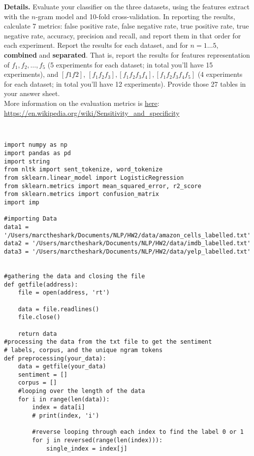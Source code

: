 \documentclass[12pt]{article}
\begin{document}
\begin{enumerate}
{\bf Details.} Evaluate your classifier on the three datasets, using the features extract with the $n$-gram model and 10-fold cross-validation. In reporting the results, calculate 7 metrics: false positive rate, false negative rate, true positive rate, true negative rate, accuracy, precision and recall, and report them in that order for each experiment. Report the results for each dataset, and for $n=1\dots 5$, {\bf combined} and {\bf separated}. That is, report the results for features representation of $f_1, f_2, \dots, f_5$ (5 experiments for each dataset; in total you'll have 15 experiments), and $[f1 f2]$, $[f_1 f_2 f_3], [f_1 f_2 f_3 f_4], [f_1 f_2 f_3 f_4 f_5]$ (4 experiments for each dataset; in total you'll have 12 experiments). Provide those 27 tables in your answer sheet. \\

More information on the evaluation metrics is \href{https://en.wikipedia.org/wiki/Sensitivity_and_specificity}{here}: \url{https://en.wikipedia.org/wiki/Sensitivity_and_specificity}

\lstset{language = Python}
\begin{flushleft}
\begin{lstlisting}


import numpy as np
import pandas as pd
import string
from nltk import sent_tokenize, word_tokenize
from sklearn.linear_model import LogisticRegression
from sklearn.metrics import mean_squared_error, r2_score
from sklearn.metrics import confusion_matrix
import imp

#importing Data
data1 = '/Users/marctheshark/Documents/NLP/HW2/data/amazon_cells_labelled.txt'
data2 = '/Users/marctheshark/Documents/NLP/HW2/data/imdb_labelled.txt'
data3 = '/Users/marctheshark/Documents/NLP/HW2/data/yelp_labelled.txt'


#gathering the data and closing the file
def getfile(address):
    file = open(address, 'rt')

    data = file.readlines()
    file.close()

    return data
#processing the data from the txt file to get the sentiment
# labels, corpus, and the unique ngram tokens
def preprocessing(your_data):
    data = getfile(your_data)
    sentiment = []
    corpus = []
    #looping over the length of the data
    for i in range(len(data)):
        index = data[i]
        # print(index, 'i')

        #reverse looping through each index to find the label 0 or 1
        for j in reversed(range(len(index))):
            single_index = index[j]



\end{lstlisting}
\end{flushleft}
\end{enumerate}
\end{document}
